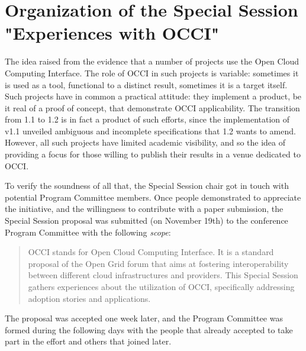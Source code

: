 \documentclass[10pt,a4paper]{article}
\begin{document}
\section{Organization of the Special Session "Experiences with OCCI"}

The idea raised from the evidence that a number of projects use the Open Cloud Computing Interface. The role of OCCI in such projects is variable: sometimes it is used as a tool, functional to a distinct result, sometimes it is a target itself. Such projects have in common a practical attitude: they implement a product, be it real of a proof of concept, that demonstrate OCCI applicability. The transition from 1.1 to 1.2 is in fact a product of such efforts, since the implementation of v1.1 unveiled ambiguous and incomplete specifications that 1.2 wants to amend. However, all such projects have limited academic visibility, and so the idea of providing a focus for those willing to publish their results in a venue dedicated to OCCI.

To verify the soundness of all that, the Special Session chair got in touch with potential Program Committee members. Once people demonstrated to appreciate the initiative, and the willingness to contribute with a paper submission, the Special Session proposal was submitted (on November 19th) to the conference Program Committee with the following {\em scope}:

\begin{quote}
	OCCI stands for Open Cloud Computing Interface. It is a standard proposal of the Open Grid forum that aims at fostering interoperability between different cloud infrastructures and providers. This Special Session gathers experiences about the utilization of OCCI, specifically addressing adoption stories and applications.
\end{quote}

The proposal was accepted one week later, and the Program Committee was formed during the following days with the people that already accepted to take part in the effort and others that joined later.
\end{document}
